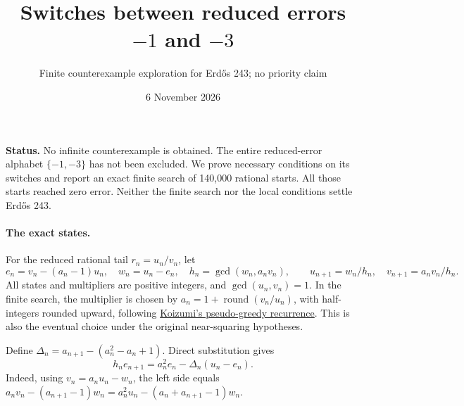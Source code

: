 \documentclass[11pt]{article}
\title{Switches between reduced errors $-1$ and $-3$}
\author{Finite counterexample exploration for Erd\H{o}s 243; no priority claim}
\date{6 November 2026}
\begin{document}
\maketitle

\noindent\textbf{Status.} No infinite counterexample is obtained.
The entire reduced-error alphabet $\{-1,-3\}$ has not been excluded.
We prove necessary conditions on its switches and report an exact finite
search of 140,000 rational starts. All those starts reached zero error.
Neither the finite search nor the local conditions settle Erd\H{o}s 243.

\paragraph{The exact states.}
For the reduced rational tail $r_n=u_n/v_n$, let
\[
 e_n=v_n-(a_n-1)u_n,\quad w_n=u_n-e_n,\quad
 h_n=\gcd(w_n,a_nv_n),\qquad
 u_{n+1}=w_n/h_n,\quad v_{n+1}=a_nv_n/h_n.
\]
All states and multipliers are positive integers, and
$\gcd(u_n,v_n)=1$. In the finite search, the multiplier is chosen by
$a_n=1+\operatorname{round}(v_n/u_n)$, with half-integers rounded
upward, following
\href{https://math.colgate.edu/~integers/aa28/aa28.pdf}{Koizumi's
pseudo-greedy recurrence}. This is also the eventual choice under the
original near-squaring hypotheses.

Define $\Delta_n=a_{n+1}-(a_n^2-a_n+1)$. Direct substitution gives
\begin{equation}\label{eq:error}
 h_ne_{n+1}=a_n^2e_n-\Delta_n(u_n-e_n).
\end{equation}
Indeed, using $v_n=a_nu_n-w_n$, the left side equals
$a_nv_n-(a_{n+1}-1)w_n
=a_n^2u_n-(a_n+a_{n+1}-1)w_n$.
\end{document}
